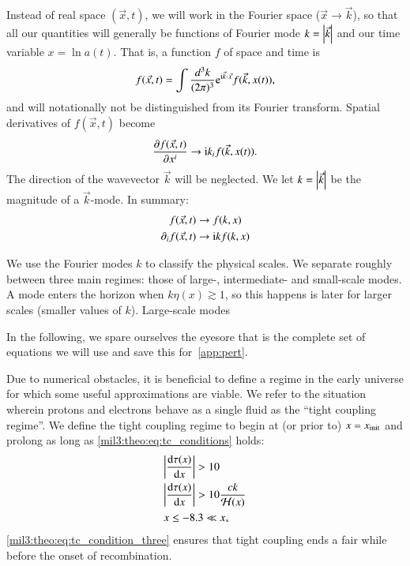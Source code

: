 Instead of real space $(\vec{x}, t)$, we will work in the Fourier space ($\vec{x}\to\vec{k}$), so that all our quantities will generally be functions of Fourier mode $k=\abs{\vec{k}}$ and our time variable $x = \ln{a(t)}$. That is, a function $f$ of space and time is
\begin{equation}
    f(\vec{x}, t) = \int \frac{d^3 k}{(2\pi)^3} \eu^{\im \vec{k}\cdot \vec{x}}f(\vec{k}, x(t)),
\end{equation}
and will notationally not be distinguished from its Fourier transform. Spatial derivatives of $f(\vec{x}, t)$ become
\begin{equation}
    \pdv{f(\vec{x}, t)}{x^i} \to \mathrm{i} k_i f(\vec{k}, x(t)).
\end{equation}
The direction of the wavevector $\vec{k}$ will be neglected. We let $k=\abs{\vec{k}}$ be the magnitude of a $\vec{k}$-mode. In summary:
\begin{equation}
\begin{split}
    f(\vec{x}, t) &\to f(k, x) \\
    \partial_i f(\vec{x}, t) &\to \mathrm{i} k f(k, x)
\end{split}
\end{equation}

We use the Fourier modes $k$ to classify the physical scales. We separate roughly between three main regimes: those of large-, intermediate- and small-scale modes. A mode enters the horizon when $k\eta(x) \gtrsim 1$, so this happens is later for larger scales (smaller values of $k$). Large-scale modes 

In the following, we spare ourselves the eyesore that is the complete set of equations we will use and save this for~\cref{app:pert}.


Due to numerical obstacles, it is beneficial to define a regime in the early universe for which some useful approximations are viable. We refer to the situation wherein protons and electrons behave as a single fluid as the ``tight coupling regime''. We define the tight coupling regime to begin at (or prior to) $x=x_\mathrm{init}$ and prolong as long as \cref{mil3:theo:eq:tc_conditions} holds:
\begin{subequations}\label{mil3:theo:eq:tc_conditions}
\begin{align}
    &\abs{\dv{\tau(x)}{x}} > 10 \label{mil3:theo:eq:tc_condition_one} \\
    & \abs{\dv{\tau(x)}{x}} > 10 \frac{ck}{\mathcal{H}(x)} \label{mil3:theo:eq:tc_condition_two}\\
    &x \leq -8.3 \ll x_* \label{mil3:theo:eq:tc_condition_three}
\end{align}
\end{subequations}
\cref{mil3:theo:eq:tc_condition_three} ensures that tight coupling ends a fair while before the onset of recombination. 



